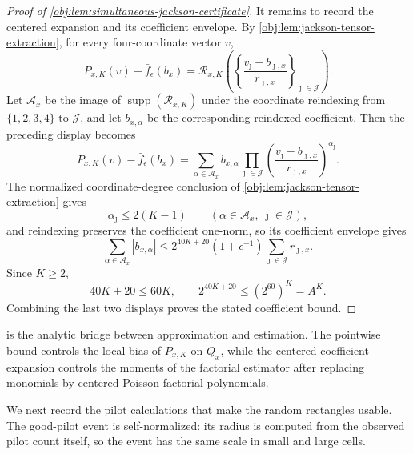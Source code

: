 \documentclass[11pt]{article}
\begin{document}
\begin{proof}[Proof of \cref{obj:lem:simultaneous-jackson-certificate}]
It remains to record the centered expansion and its coefficient envelope. By
\cref{obj:lem:jackson-tensor-extraction}, for every four-coordinate vector \(v\),
\[
P_{x,K}(v)-\bar f_\epsilon(b_x)
=
\mathcal R_{x,K}\left(
\left\{\frac{v_{\jmath}-b_{\jmath,x}}{r_{\jmath,x}}\right\}_{\jmath\in\mathcal J}
\right).
\]
Let \(\mathcal A_x\) be the image of \(\operatorname{supp}(\mathcal R_{x,K})\) under the coordinate reindexing
from \(\{1,2,3,4\}\) to \(\mathcal J\), and let \(b_{x,\alpha}\) be the corresponding reindexed coefficient.
Then the preceding display becomes
\[
P_{x,K}(v)-\bar f_\epsilon(b_x)
=
\sum_{\alpha\in\mathcal A_x}
b_{x,\alpha}
\prod_{\jmath\in\mathcal J}
\left(\frac{v_{\jmath}-b_{\jmath,x}}{r_{\jmath,x}}\right)^{\alpha_{\jmath}}.
\]
The normalized coordinate-degree conclusion of \cref{obj:lem:jackson-tensor-extraction} gives
\[
\alpha_{\jmath}\le 2(K-1)
\qquad
(\alpha\in\mathcal A_x,\ \jmath\in\mathcal J),
\]
and reindexing preserves the coefficient one-norm, so its coefficient envelope gives
\[
\sum_{\alpha\in\mathcal A_x}|b_{x,\alpha}|
\le
2^{40K+20}(1+\epsilon^{-1})
\sum_{\jmath\in\mathcal J}r_{\jmath,x}.
\]
Since \(K\ge2\),
\[
40K+20\le60K,
\qquad
2^{40K+20}\le (2^{60})^K=A^K.
\]
Combining the last two displays proves the stated coefficient bound.
\end{proof}

 is the analytic bridge between approximation and estimation. The pointwise bound controls the local bias of \(P_{x,K}\) on \(Q_x\), while the centered coefficient expansion controls the moments of the factorial estimator after replacing monomials by centered Poisson factorial polynomials.

We next record the pilot calculations that make the random rectangles usable. The good-pilot event is self-normalized: its radius is computed from the observed pilot count itself, so the event has the same scale in small and large cells.
\end{document}
